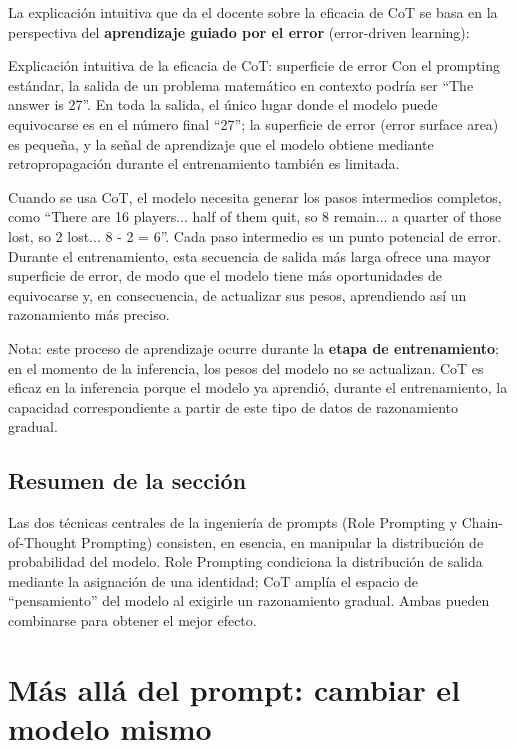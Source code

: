 \documentclass[a4paper]{article}
\begin{document}
La explicación intuitiva que da el docente sobre la eficacia de CoT se basa en la perspectiva del \textbf{aprendizaje guiado por el error} (error-driven learning):

\begin{knowledgebox}{Explicación intuitiva de la eficacia de CoT: superficie de error}
Con el prompting estándar, la salida de un problema matemático en contexto podría ser ``The answer is 27''. En toda la salida, el único lugar donde el modelo puede equivocarse es en el número final ``27''; la superficie de error (error surface area) es pequeña, y la señal de aprendizaje que el modelo obtiene mediante retropropagación durante el entrenamiento también es limitada.

Cuando se usa CoT, el modelo necesita generar los pasos intermedios completos, como ``There are 16 players... half of them quit, so 8 remain... a quarter of those lost, so 2 lost... 8 - 2 = 6''. Cada paso intermedio es un punto potencial de error. Durante el entrenamiento, esta secuencia de salida más larga ofrece una mayor superficie de error, de modo que el modelo tiene más oportunidades de equivocarse y, en consecuencia, de actualizar sus pesos, aprendiendo así un razonamiento más preciso.

Nota: este proceso de aprendizaje ocurre durante la \textbf{etapa de entrenamiento}; en el momento de la inferencia, los pesos del modelo no se actualizan. CoT es eficaz en la inferencia porque el modelo ya aprendió, durante el entrenamiento, la capacidad correspondiente a partir de este tipo de datos de razonamiento gradual.
\end{knowledgebox}

\subsection{Resumen de la sección}

Las dos técnicas centrales de la ingeniería de prompts (Role Prompting y Chain-of-Thought Prompting) consisten, en esencia, en manipular la distribución de probabilidad del modelo. Role Prompting condiciona la distribución de salida mediante la asignación de una identidad; CoT amplía el espacio de ``pensamiento'' del modelo al exigirle un razonamiento gradual. Ambas pueden combinarse para obtener el mejor efecto.

\section{Más allá del prompt: cambiar el modelo mismo}
\end{document}
